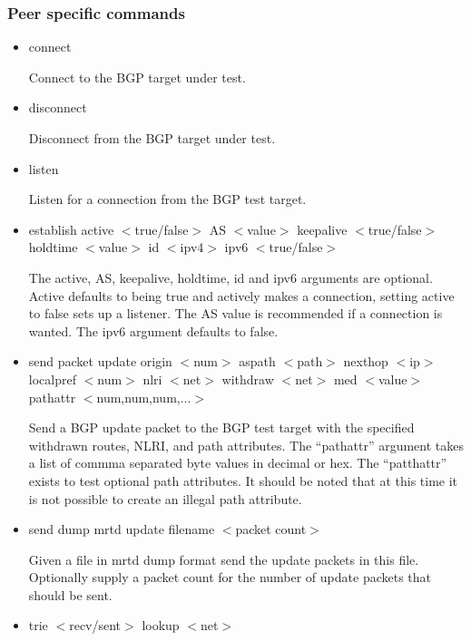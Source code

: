 \documentclass[11pt]{article}
\begin{document}
\subsubsection{Peer specific commands}

\begin{itemize}

\item connect

  Connect to the BGP target under test.

\item disconnect

  Disconnect from the BGP target under test.

\item listen 

  Listen for a connection from the BGP test target.

\item {\sf establish
  active $<$true/false$>$
  AS $<$value$>$
  keepalive $<$true/false$>$
  holdtime $<$value$>$ 
  id $<$ipv4$>$}
  ipv6 $<$true/false$>$

  The active, AS, keepalive, holdtime, id and ipv6 arguments are
  optional. Active defaults to being true and actively makes a
  connection, setting active to false sets up a listener. The AS value
  is recommended if a connection is wanted. The ipv6 argument defaults
  to false.

\item {\sf send packet update 
  origin $<$num$>$ 
  aspath $<$path$>$ 
  nexthop $<$ip$>$ 
  localpref $<$num$>$
  nlri $<$net$>$
  withdraw $<$net$>$
  med $<$value$>$
  pathattr $<$num,num,num,...$>$}

  Send a BGP update packet to the BGP test target with the specified
  withdrawn routes, NLRI, and path attributes. The ``pathattr''
  argument takes a list of commma separated byte values in decimal or
  hex. The ``patthattr'' exists to test optional path attributes. It
  should be noted that at this time it is not possible to create an
  illegal path attribute.

\item {\sf send dump mrtd update filename $<$packet count$>$}
  
  Given a file in mrtd dump format send the update packets in this
  file. Optionally supply a packet count for the number of update
  packets that should be sent.

\item {\sf trie $<$recv/sent$>$ lookup $<$net$>$}


\end{itemize}
\end{document}
